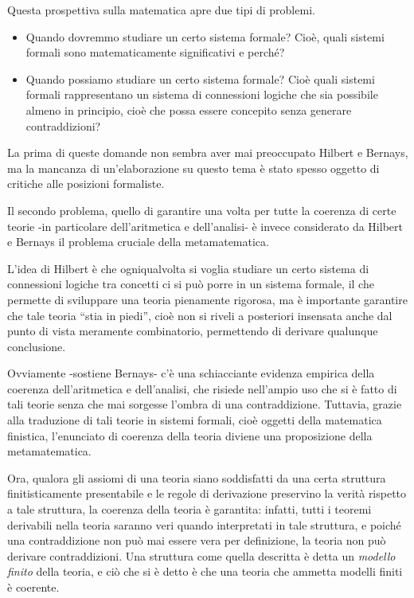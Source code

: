 Questa prospettiva sulla matematica apre due tipi di problemi.
\begin{itemize}
\item Quando dovremmo studiare un certo sistema formale? Cioè, quali sistemi formali sono matematicamente significativi e perché?
\item Quando possiamo studiare un certo sistema formale? Cioè quali sistemi formali rappresentano un sistema di connessioni logiche che sia possibile almeno in principio, cioè che possa essere concepito senza generare contraddizioni?
\end{itemize}

La prima di queste domande non sembra aver mai preoccupato Hilbert e Bernays, ma la mancanza di un'elaborazione su questo tema è stato spesso oggetto di critiche alle posizioni formaliste.

Il secondo problema, quello di garantire una volta per tutte la coerenza di certe teorie -in particolare dell'aritmetica e dell'analisi- è invece considerato da Hilbert e Bernays il problema cruciale della metamatematica.

L'idea di Hilbert è che ogniqualvolta si voglia studiare un certo sistema di connessioni logiche tra concetti ci si può porre in un sistema formale, il che permette di sviluppare una teoria pienamente rigorosa, ma è importante garantire che tale teoria ``stia in piedi'', cioè non si riveli a posteriori insensata anche dal punto di vista meramente combinatorio, permettendo di derivare qualunque conclusione.

Ovviamente -sostiene Bernays- c'è una schiacciante evidenza empirica della coerenza dell'aritmetica e dell'analisi, che risiede nell'ampio uso che si è fatto di tali teorie senza che mai sorgesse l'ombra di una contraddizione. Tuttavia, grazie alla traduzione di tali teorie in sistemi formali, cioè oggetti della ma\-te\-ma\-ti\-ca finistica, l'enunciato di coerenza della teoria diviene una proposizione della metamatematica.

Ora, qualora gli assiomi di una teoria siano soddisfatti da una certa struttura finitisticamente presentabile e le regole di derivazione preservino la verità rispetto a tale struttura, la coerenza della teoria è garantita: infatti, tutti i teoremi de\-ri\-va\-bi\-li nella teoria saranno veri quando interpretati in tale struttura, e poiché una contraddizione non può mai essere vera per definizione, la teoria non può derivare contraddizioni.
Una struttura come quella descritta è detta un \emph{modello finito} della teoria, e ciò che si è detto è che una teoria che ammetta modelli finiti è coerente.

